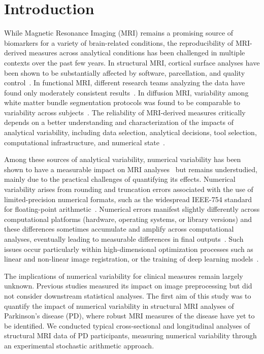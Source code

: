 \section{Introduction}

While Magnetic Resonance Imaging (MRI) remains a promising source of biomarkers
for a variety of brain-related conditions, the reproducibility of MRI-derived
measures across analytical conditions has been challenged in multiple contexts
over the past few years. In structural MRI, cortical surface analyses have been
shown to be substantially affected by software, parcellation, and quality
control~\cite{bhagwat2021understanding}. In functional MRI, different research
teams analyzing the data have found only moderately consistent
results~\cite{botvinik2020variability}. In diffusion MRI, variability among
white matter bundle segmentation protocols was found to be comparable to
variability across subjects~\cite{schilling2021tractography}. The reliability
of MRI-derived measures critically depends on a better understanding and
characterization of the impacts of analytical variability, including data
selection, analytical decisions, tool selection, computational infrastructure,
and numerical state~\cite{kennedy2019everything,kiar2024experimental}.

Among these sources of analytical variability, numerical variability has been
shown to have a measurable impact on MRI
analyses~\cite{gronenschild2012effects,glatard2015reproducibility} but remains
understudied, mainly due to the practical challenges of quantifying its
effects. Numerical variability arises from rounding and truncation errors
associated with the use of limited-precision numerical formats, such as the
widespread IEEE-754 standard for floating-point
arithmetic~\cite{markstein2008new}. Numerical errors manifest slightly
differently across computational platforms (hardware, operating systems, or
library versions) and these differences sometimes accumulate and amplify across
computational analyses, eventually leading to measurable differences in final
outputs~\cite{salari2021accurate,kiar2021numerical,des2023reproducibility,vila2024impact,chatelain2024numerical,mirhakimi2025numerical}.
Such issues occur particularly within high-dimensional optimization processes
such as linear and non-linear image registration, or the training of deep
learning models~\cite{gonzalez2025uncertain}.

The implications of numerical variability for clinical measures remain largely
unknown. Previous studies measured its impact on image preprocessing but did
not consider downstream statistical analyses. The first aim of this study was
to quantify the impact of numerical variability in structural MRI analyses of
Parkinson's disease (PD), where robust MRI measures of the disease have yet to
be identified. We conducted typical cross-sectional and longitudinal analyses
of structural MRI data of PD participants, measuring numerical variability
through an experimental stochastic arithmetic approach.

